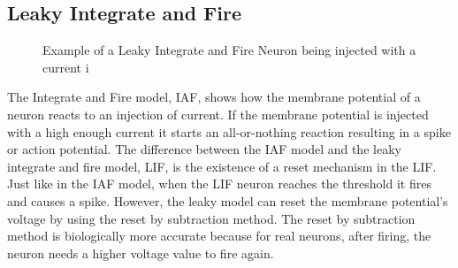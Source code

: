 
\subsection{Leaky Integrate and Fire}

\begin{figure}[h]
	\begin{center}
	
	\end{center}
	\caption{Example of a Leaky Integrate and Fire Neuron being injected with a current {i}}
\end{figure}

The Integrate and Fire model, IAF, shows how the membrane potential of a neuron reacts to an injection of current. If the membrane potential is injected with a high enough current it starts an all-or-nothing reaction resulting in a spike or action potential. The difference between the IAF model and the leaky integrate and fire model, LIF, is the existence of a reset mechanism in the LIF. Just like in the IAF model, when the LIF neuron reaches the threshold it fires and causes a spike. However, the leaky model can reset the membrane potential's voltage by using the reset by subtraction method. The reset by subtraction method is biologically more accurate because for real neurons, after firing, the neuron needs a higher voltage value to fire again.







